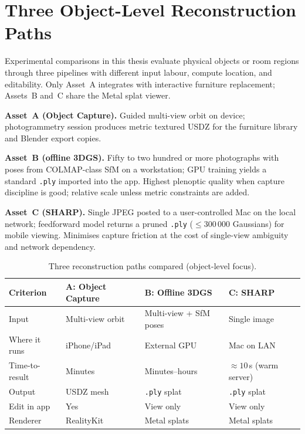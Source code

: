 \section{Three Object-Level Reconstruction Paths}
\label{sec:three_assets}

Experimental comparisons in this thesis evaluate physical objects or room regions through three pipelines with different input labour, compute location, and editability. Only Asset~A integrates with interactive furniture replacement; Assets~B and~C share the Metal splat viewer.

\textbf{Asset~A (Object Capture).} Guided multi-view orbit on device; photogrammetry session produces metric textured USDZ for the furniture library and Blender export copies.

\textbf{Asset~B (offline 3DGS).} Fifty to two hundred or more photographs with poses from COLMAP-class SfM on a workstation; GPU training yields a standard \texttt{.ply} imported into the app. Highest plenoptic quality when capture discipline is good; relative scale unless metric constraints are added.

\textbf{Asset~C (SHARP).} Single JPEG posted to a user-controlled Mac on the local network; feedforward model returns a pruned \texttt{.ply} ($\leq 300\,000$ Gaussians) for mobile viewing. Minimises capture friction at the cost of single-view ambiguity and network dependency.

\begin{table}[htbp]
\centering
\caption{Three reconstruction paths compared (object-level focus).}
\label{tab:three_assets}
\small
\begin{tabular}{|p{2.1cm}|p{3.1cm}|p{3.1cm}|p{3.1cm}|}
\hline
\textbf{Criterion} & \textbf{A: Object Capture} & \textbf{B: Offline 3DGS} & \textbf{C: SHARP} \\
\hline
Input & Multi-view orbit & Multi-view + SfM poses & Single image \\
\hline
Where it runs & iPhone/iPad & External GPU & Mac on LAN \\
\hline
Time-to-result & Minutes & Minutes--hours & $\approx 10\,$s (warm server) \\
\hline
Output & USDZ mesh & \texttt{.ply} splat & \texttt{.ply} splat \\
\hline
Edit in app & Yes & View only & View only \\
\hline
Renderer & RealityKit & Metal splats & Metal splats \\
\hline
\end{tabular}
\end{table}

